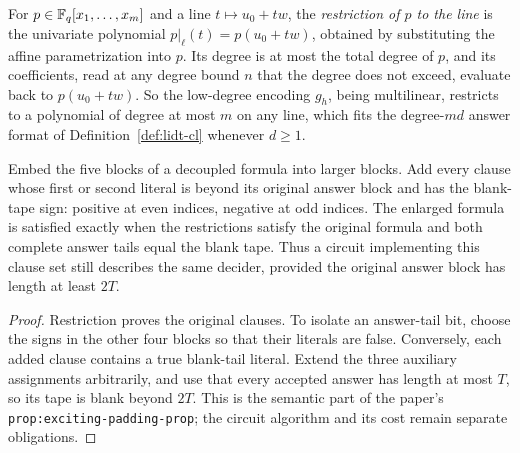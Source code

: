 \begin{definition}
\label{def:line-restriction}
\leanok
For $p \in \mathbb{F}_q[x_1, \ldots, x_m]$ and a line $t \mapsto u_0 + t w$, the \emph{restriction of $p$
to the line} is the univariate polynomial $p|_\ell(t) = p(u_0 + t w)$, obtained by substituting the
affine parametrization into $p$. Its degree is at most the total degree of $p$, and its
coefficients, read at any degree bound $n$ that the degree does not exceed, evaluate back to
$p(u_0 + t w)$. So the low-degree encoding $g_h$, being multilinear, restricts to a polynomial of
degree at most $m$ on any line, which fits the degree-$md$ answer format of
Definition~\ref{def:lidt-cl} whenever $d \geq 1$.
\end{definition}

\effortHard

\begin{lemma}
\label{lem:pcp-padding-semantics}
\leanok
Embed the five blocks of a decoupled formula into larger blocks. Add every clause
whose first or second literal is beyond its original answer block and has the
blank-tape sign: positive at even indices, negative at odd indices. The enlarged
formula is satisfied exactly when the restrictions satisfy the original formula
and both complete answer tails equal the blank tape. Thus a circuit implementing
this clause set still describes the same decider, provided the original answer
block has length at least $2T$.
\end{lemma}

\begin{proof}
\leanok
Restriction proves the original clauses. To isolate an answer-tail bit, choose
the signs in the other four blocks so that their literals are false. Conversely,
each added clause contains a true blank-tail literal. Extend the three auxiliary
assignments arbitrarily, and use that every accepted answer has length at most
$T$, so its tape is blank beyond $2T$. This is the semantic part of the paper's
\texttt{prop:exciting-padding-prop}; the circuit algorithm and its cost remain
separate obligations.
\end{proof}

